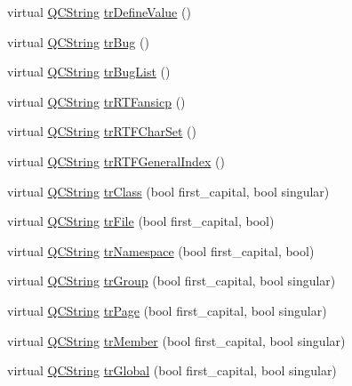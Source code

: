 \begin{DoxyCompactItemize}
\item 
virtual \hyperlink{class_q_c_string}{Q\-C\-String} \hyperlink{class_translator_italian_ae6be6e403011f5b069dde07447839f9e}{tr\-Define\-Value} ()
\item 
virtual \hyperlink{class_q_c_string}{Q\-C\-String} \hyperlink{class_translator_italian_abfa1d6c97f4c2967ebbd515db5590ec6}{tr\-Bug} ()
\item 
virtual \hyperlink{class_q_c_string}{Q\-C\-String} \hyperlink{class_translator_italian_a6922767c9b6ff214503967c6f8b66468}{tr\-Bug\-List} ()
\item 
virtual \hyperlink{class_q_c_string}{Q\-C\-String} \hyperlink{class_translator_italian_ac711f1a109c3c8131bf02a9ff6f48e36}{tr\-R\-T\-Fansicp} ()
\item 
virtual \hyperlink{class_q_c_string}{Q\-C\-String} \hyperlink{class_translator_italian_af3bba50fd4e382b113171e132e88719b}{tr\-R\-T\-F\-Char\-Set} ()
\item 
virtual \hyperlink{class_q_c_string}{Q\-C\-String} \hyperlink{class_translator_italian_a6a04ffa0f1114981e258cf0a94478c98}{tr\-R\-T\-F\-General\-Index} ()
\item 
virtual \hyperlink{class_q_c_string}{Q\-C\-String} \hyperlink{class_translator_italian_a2b5bc0be4e846d4ee6e3430ddeb3cf53}{tr\-Class} (bool first\-\_\-capital, bool singular)
\item 
virtual \hyperlink{class_q_c_string}{Q\-C\-String} \hyperlink{class_translator_italian_a3e573647abaa1a2a134b3cbf2b384e6d}{tr\-File} (bool first\-\_\-capital, bool)
\item 
virtual \hyperlink{class_q_c_string}{Q\-C\-String} \hyperlink{class_translator_italian_a8051c9030258613d31e99e638817a377}{tr\-Namespace} (bool first\-\_\-capital, bool)
\item 
virtual \hyperlink{class_q_c_string}{Q\-C\-String} \hyperlink{class_translator_italian_a2825eb7956ddf759028c8957352e627d}{tr\-Group} (bool first\-\_\-capital, bool singular)
\item 
virtual \hyperlink{class_q_c_string}{Q\-C\-String} \hyperlink{class_translator_italian_a719e433b483932299fd17e751decdfb2}{tr\-Page} (bool first\-\_\-capital, bool singular)
\item 
virtual \hyperlink{class_q_c_string}{Q\-C\-String} \hyperlink{class_translator_italian_aaded5c915d8cd335abcd0e65e535cd71}{tr\-Member} (bool first\-\_\-capital, bool singular)
\item 
virtual \hyperlink{class_q_c_string}{Q\-C\-String} \hyperlink{class_translator_italian_ac9f8f800abe2f721d9cf0bdfc9b6ec6f}{tr\-Global} (bool first\-\_\-capital, bool singular)

\end{DoxyCompactItemize}
